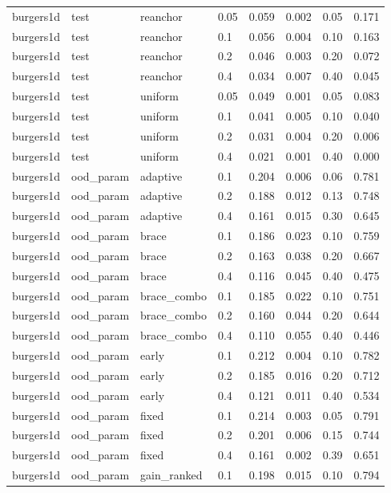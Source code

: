 \begin{tabular}{llllrrrr}
burgers1d & test & reanchor & 0.05 & 0.059 & 0.002 & 0.05 & 0.171 \\
burgers1d & test & reanchor & 0.1 & 0.056 & 0.004 & 0.10 & 0.163 \\
burgers1d & test & reanchor & 0.2 & 0.046 & 0.003 & 0.20 & 0.072 \\
burgers1d & test & reanchor & 0.4 & 0.034 & 0.007 & 0.40 & 0.045 \\
burgers1d & test & uniform & 0.05 & 0.049 & 0.001 & 0.05 & 0.083 \\
burgers1d & test & uniform & 0.1 & 0.041 & 0.005 & 0.10 & 0.040 \\
burgers1d & test & uniform & 0.2 & 0.031 & 0.004 & 0.20 & 0.006 \\
burgers1d & test & uniform & 0.4 & 0.021 & 0.001 & 0.40 & 0.000 \\
\midrule
burgers1d & ood\_param & adaptive & 0.1 & 0.204 & 0.006 & 0.06 & 0.781 \\
burgers1d & ood\_param & adaptive & 0.2 & 0.188 & 0.012 & 0.13 & 0.748 \\
burgers1d & ood\_param & adaptive & 0.4 & 0.161 & 0.015 & 0.30 & 0.645 \\
burgers1d & ood\_param & brace & 0.1 & 0.186 & 0.023 & 0.10 & 0.759 \\
burgers1d & ood\_param & brace & 0.2 & 0.163 & 0.038 & 0.20 & 0.667 \\
burgers1d & ood\_param & brace & 0.4 & 0.116 & 0.045 & 0.40 & 0.475 \\
burgers1d & ood\_param & brace\_combo & 0.1 & 0.185 & 0.022 & 0.10 & 0.751 \\
burgers1d & ood\_param & brace\_combo & 0.2 & 0.160 & 0.044 & 0.20 & 0.644 \\
burgers1d & ood\_param & brace\_combo & 0.4 & 0.110 & 0.055 & 0.40 & 0.446 \\
burgers1d & ood\_param & early & 0.1 & 0.212 & 0.004 & 0.10 & 0.782 \\
burgers1d & ood\_param & early & 0.2 & 0.185 & 0.016 & 0.20 & 0.712 \\
burgers1d & ood\_param & early & 0.4 & 0.121 & 0.011 & 0.40 & 0.534 \\
burgers1d & ood\_param & fixed & 0.1 & 0.214 & 0.003 & 0.05 & 0.791 \\
burgers1d & ood\_param & fixed & 0.2 & 0.201 & 0.006 & 0.15 & 0.744 \\
burgers1d & ood\_param & fixed & 0.4 & 0.161 & 0.002 & 0.39 & 0.651 \\
burgers1d & ood\_param & gain\_ranked & 0.1 & 0.198 & 0.015 & 0.10 & 0.794 \\

\end{tabular}
